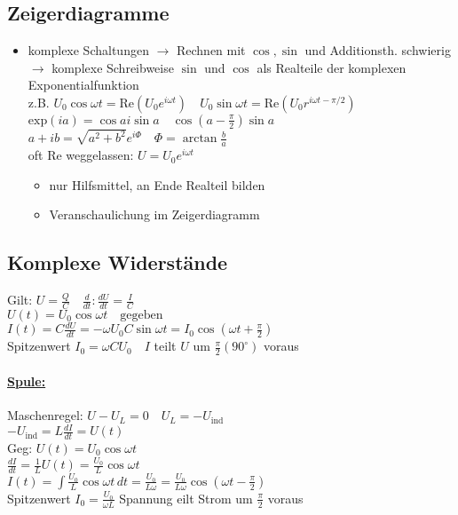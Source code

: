 \documentclass[titlepage,12pt,a4paper,ngerman]{report}
\newcommand{\tx}[1]{\textrm{#1}}
\newcommand{\uind}{U_{\tx{ind}}}
\begin{document}
\subsection{Zeigerdiagramme}
\begin{itemize}
	\item komplexe Schaltungen $ \rightarrow $ Rechnen mit $ \cos ,\sin $ und Additionsth. schwierig\\
	$ \rightarrow $ komplexe Schreibweise $ \sin $ und $ \cos $ als Realteile der komplexen Exponentialfunktion\\
	z.B. $ U_0 \cos \omega t = \tx{Re}(U_0 e^{i \omega t} ) \quad U_0 \sin \omega t = \tx{Re} ( U_0 r ^{i \omega t - \pi/2}) $\\
	$ \tx{exp}(i a) = \cos a i \sin a \quad \cos (a- \frac{\pi}{2}) \sin a $\\
	$ a+ib = \sqrt{a^2 + b^2} e^{i\Phi} \quad \Phi = \arctan \frac{b}{a} $\\
	oft Re weggelassen: $ U = U_0 e^{i\omega t} $
	\begin{itemize}
		\item nur Hilfsmittel, an Ende Realteil bilden
		\item  Veranschaulichung im Zeigerdiagramm
	\end{itemize}
\end{itemize}

\subsection{Komplexe Widerstände}
Gilt: $ U = \frac{Q}{C} \quad \frac{d}{dt}: \frac{dU}{dt} = \frac{I}{C} $\\
$ U(t) = U_0 \cos \omega t \quad \tx{gegeben} $\\
$ I(t) = C \frac{dU}{dt} = - \omega U_0 C \sin \omega t = I_0 \cos (\omega t + \frac{\pi}{2}) $\\
Spitzenwert $ I_0 = \omega C U_0 \quad I $ teilt $ U $ um $ \frac{\pi}{2} (90^\circ) $ voraus\\
\paragraph{\underline{Spule:}} Maschenregel: $ U-U_L = 0 \quad U_L = - \uind $\\
$ - \uind = L \frac{dI}{dt} = U(t) $\\
Geg: $ U(t) = U_0 \cos \omega t $\\
$ \frac{dI}{dt} = \frac{1}{L} U(t) = \frac{U_0}{L} \cos \omega t $\\
$ I(t) = \int \frac{U_0}{L} \cos \omega t \, dt = \frac{U_0}{L\omega} = \frac{U_0}{L\omega} \cos ( \omega t - \frac{\pi}{2}) $\\
Spitzenwert $ I_0 = \frac{U_0}{\omega L} $ Spannung eilt Strom um $ \frac{\pi}{2} $ voraus
\end{document}
